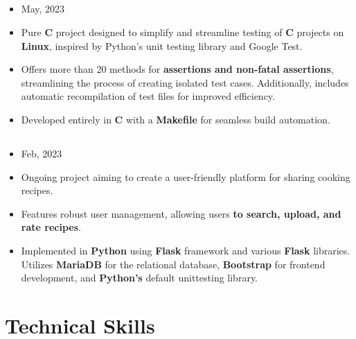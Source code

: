 \message{ !name(MyResume.tex)}\documentclass[11pt]{article}
\begin{document}
\subsection*{\href{https://github.com/alecksandr26/unittest-c}{\color{blue}{Unit Testing Framework for C in Linux:}}}
\vspace{-0.3cm}
\begin{itemize}[noitemsep, nolistsep]
\item May, 2023
\item Pure \textbf{C} project designed to simplify and streamline testing of \textbf{C} projects on
  \textbf{Linux}, inspired by Python's unit testing library and Google Test.
\item Offers more than 20 methods for \textbf{assertions and non-fatal assertions}, streamlining the
  process of creating isolated test cases. Additionally, includes automatic recompilation of test files
  for improved efficiency.
\item Developed entirely in \textbf{C} with a \textbf{Makefile} for seamless build automation.
\end{itemize}
\vspace{-0.3cm}
\subsection*{\href{https://github.com/alecksandr26/recipe-app-web}{\color{blue}{Cooking Recipes Web App:}}}
\vspace{-0.3cm}
\begin{itemize}[noitemsep, nolistsep]
\item Feb, 2023
\item Ongoing project aiming to create a user-friendly platform for sharing cooking recipes.
\item Features robust user management, allowing users \textbf{to search, upload, and rate recipes}.
\item Implemented in \textbf{Python} using \textbf{Flask} framework and various \textbf{Flask} libraries.
  Utilizes \textbf{MariaDB} for the relational database,
  \textbf{Bootstrap} for frontend development, and \textbf{Python's} default unittesting library.
\end{itemize}

\vspace{-0.5cm}
\section*{Technical Skills}
\vspace{-0.3cm}
\titlerule[0.3pt]
\vspace{0.1cm}
\end{document}
